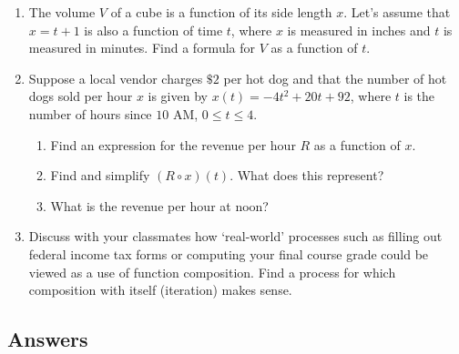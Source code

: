 \begin{enumerate}
\setcounter{enumi}{\value{HW}}


\item The volume $V$ of a cube is a function of its side length $x$.  Let's assume that $x = t + 1$ is also a function of time $t$, where $x$ is measured in inches and $t$ is measured in minutes.  Find a formula for $V$ as a function of $t$.

\item  Suppose a local vendor charges $\$2$ per hot dog and that the number of hot dogs sold per hour $x$ is given by $x(t) = -4t^2+20t+92$, where $t$ is the number of hours since $10$ AM, $0 \leq t \leq 4$.

\begin{enumerate}

\item  Find an expression for the revenue per hour $R$ as a function of $x$.
\item  Find and simplify $\left(R \circ x\right)(t)$.  What does this represent?
\item  What is the revenue per hour at noon?

\end{enumerate}

\item Discuss with your classmates how `real-world' processes such as filling out federal income tax forms or computing your final course grade could be viewed as a use of function composition.  Find a process for which composition with itself (iteration) makes sense.

\end{enumerate}

\clearpage

\subsection{Answers}

\startexenum

